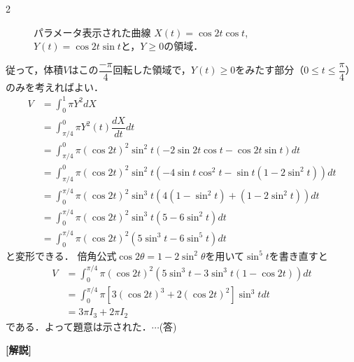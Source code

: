 \documentclass[../../main.tex]{subfiles}
\begin{document}
\begin{multicols}{2}
\begin{figure}[H]
    \caption{パラメータ表示された曲線 $X(t) = \cos 2t \cos t$, $Y(t) = \cos 2t \sin t$と，$Y\ge 0$の領域．}
    \label{1998-6:fig:2}
  \end{figure}

  従って，体積$V$はこの$\dfrac{-\pi}{4}$回転した領域で，$Y(t) \ge 0$をみたす部分（$0\le t\le \dfrac{\pi}{4}$）のみを考えればよい．
  \begin{align}
    V & = \int_0^{1} \pi Y^2 dX                                                                 \\
    & = \int_{\pi/4}^{0} \pi Y^2(t) \dfrac{dX}{dt} dt                                          \\
    & = \int_{\pi/4}^{0} \pi (\cos 2t)^2 \sin^2 t (-2\sin 2t\cos t-\cos 2t\sin t ) dt         \\
    & = \int_{\pi/4}^{0} \pi (\cos 2t)^2 \sin^2 t (-4\sin t \cos^2 t - \sin t (1-2\sin^2 t)) dt \\
    & = \int_{0}^{\pi/4} \pi (\cos 2t)^2 \sin^3 t (4(1-\sin^2 t) + (1-2\sin^2 t) ) dt         \\
    & = \int_{0}^{\pi/4} \pi (\cos 2t)^2 \sin^3 t (5-6\sin^2 t) dt                            \\
    & = \int_{0}^{\pi/4} \pi (\cos 2t)^2 (5\sin^3 t-6\sin^5 t) dt
  \end{align}
  と変形できる．
  倍角公式$\cos 2\theta = 1-2\sin^2\theta$を用いて$\sin^5 t$を書き直すと
  \begin{align}
    V
    & = \int_{0}^{\pi/4} \pi  (\cos 2t)^2 (5\sin^3 t-3\sin^3 t(1-\cos 2t)) dt    \\
    & = \int_{0}^{\pi/4} \pi  \left[3(\cos 2t)^3+2(\cos 2t)^2\right] \sin^3 t dt \\
    & = 3\pi I_3 + 2\pi I_2
  \end{align}
  である．よって題意は示された．$\cdots$(答)

  {\bf [解説]}

  \newpage
\end{multicols}
\end{document}
